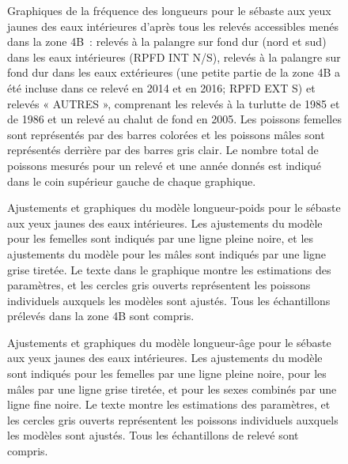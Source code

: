 \documentclass[11pt]{book}
\begin{document}
\begin{figure}[htb]

{\centering {} 

}

\caption{Graphiques de la fréquence des longueurs pour le sébaste aux yeux jaunes des eaux intérieures d'après tous les relevés accessibles menés dans la zone 4B~: relevés à la palangre sur fond dur (nord et sud) dans les eaux intérieures (RPFD INT N/S), relevés à la palangre sur fond dur dans les eaux extérieures (une petite partie de la zone 4B a été incluse dans ce relevé en 2014 et en 2016; RPFD EXT S) et relevés « AUTRES », comprenant les relevés à la turlutte de 1985 et de 1986 et un relevé au chalut de fond en 2005. Les poissons femelles sont représentés par des barres colorées et les poissons mâles sont représentés derrière par des barres gris clair. Le nombre total de poissons mesurés pour un relevé et une année donnés est indiqué dans le coin supérieur gauche de chaque graphique.}\label{fig:length-freq}
\end{figure}
\begin{figure}[htb]

{\centering {} 

}

\caption{Ajustements et graphiques du modèle longueur-poids pour le sébaste aux yeux jaunes des eaux intérieures. Les ajustements du modèle pour les femelles sont indiqués par une ligne pleine noire, et les ajustements du modèle pour les mâles sont indiqués par une ligne grise tiretée. Le texte dans le graphique montre les estimations des paramètres, et les cercles gris ouverts représentent les poissons individuels auxquels les modèles sont ajustés. Tous les échantillons prélevés dans la zone 4B sont compris.}\label{fig:length-weight}
\end{figure}
\begin{figure}[htb]

{\centering {} 

}

\caption{Ajustements et graphiques du modèle longueur-âge pour le sébaste aux yeux jaunes des eaux intérieures. Les ajustements du modèle sont indiqués pour les femelles par une ligne pleine noire, pour les mâles par une ligne grise tiretée, et pour les sexes combinés par une ligne fine noire. Le texte montre les estimations des paramètres, et les cercles gris ouverts représentent les poissons individuels auxquels les modèles sont ajustés. Tous les échantillons de relevé sont compris.}\label{fig:length-age}
\end{figure}
\end{document}
